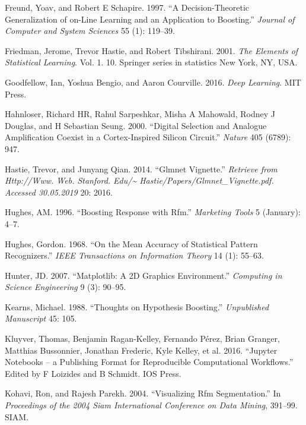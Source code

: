 \documentclass[
  11pt,
  a4paper,
  DIV=12,captions=tableheading,oneside,titlepage=firstiscover,abstracton]{scrreprt}
\begin{document}
\leavevmode\hypertarget{ref-freund1997decision}{}%
Freund, Yoav, and Robert E Schapire. 1997. ``A Decision-Theoretic Generalization of on-Line Learning and an Application to Boosting.'' \emph{Journal of Computer and System Sciences} 55 (1): 119--39.

\leavevmode\hypertarget{ref-friedman2001elements}{}%
Friedman, Jerome, Trevor Hastie, and Robert Tibshirani. 2001. \emph{The Elements of Statistical Learning}. Vol. 1. 10. Springer series in statistics New York, NY, USA.

\leavevmode\hypertarget{ref-Goodfellow-et-al-2016}{}%
Goodfellow, Ian, Yoshua Bengio, and Aaron Courville. 2016. \emph{Deep Learning}. MIT Press.

\leavevmode\hypertarget{ref-hahnloser2000digital}{}%
Hahnloser, Richard HR, Rahul Sarpeshkar, Misha A Mahowald, Rodney J Douglas, and H Sebastian Seung. 2000. ``Digital Selection and Analogue Amplification Coexist in a Cortex-Inspired Silicon Circuit.'' \emph{Nature} 405 (6789): 947.

\leavevmode\hypertarget{ref-hastie2014glmnet}{}%
Hastie, Trevor, and Junyang Qian. 2014. ``Glmnet Vignette.'' \emph{Retrieve from Http://Www. Web. Stanford. Edu/\textasciitilde{} Hastie/Papers/Glmnet\_Vignette.pdf. Accessed 30.05.2019} 20: 2016.

\leavevmode\hypertarget{ref-hughes-rfm-boost-response}{}%
Hughes, AM. 1996. ``Boosting Response with Rfm.'' \emph{Marketing Tools} 5 (January): 4--7.

\leavevmode\hypertarget{ref-hughes1968mean}{}%
Hughes, Gordon. 1968. ``On the Mean Accuracy of Statistical Pattern Recognizers.'' \emph{IEEE Transactions on Information Theory} 14 (1): 55--63.

\leavevmode\hypertarget{ref-hunter2007matplotlib}{}%
Hunter, JD. 2007. ``Matplotlib: A 2D Graphics Environment.'' \emph{Computing in Science Engineering} 9 (3): 90--95.

\leavevmode\hypertarget{ref-kearns1988thoughts}{}%
Kearns, Michael. 1988. ``Thoughts on Hypothesis Boosting.'' \emph{Unpublished Manuscript} 45: 105.

\leavevmode\hypertarget{ref-Kluyver:2016aa}{}%
Kluyver, Thomas, Benjamin Ragan-Kelley, Fernando Pérez, Brian Granger, Matthias Bussonnier, Jonathan Frederic, Kyle Kelley, et al. 2016. ``Jupyter Notebooks -- a Publishing Format for Reproducible Computational Workflows.'' Edited by F Loizides and B Schmidt. IOS Press.

\leavevmode\hypertarget{ref-kohavi2004visualizing}{}%
Kohavi, Ron, and Rajesh Parekh. 2004. ``Visualizing Rfm Segmentation.'' In \emph{Proceedings of the 2004 Siam International Conference on Data Mining}, 391--99. SIAM.
\end{document}
